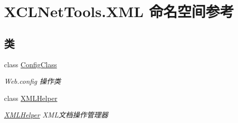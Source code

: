 \hypertarget{namespace_x_c_l_net_tools_1_1_x_m_l}{}\section{X\+C\+L\+Net\+Tools.\+X\+ML 命名空间参考}
\label{namespace_x_c_l_net_tools_1_1_x_m_l}
\subsection*{类}
\begin{DoxyCompactItemize}
\item 
class \hyperlink{class_x_c_l_net_tools_1_1_x_m_l_1_1_config_class}{Config\+Class}
\begin{DoxyCompactList}\small\item\em Web.\+config 操作类 \end{DoxyCompactList}\item 
class \hyperlink{class_x_c_l_net_tools_1_1_x_m_l_1_1_x_m_l_helper}{X\+M\+L\+Helper}
\begin{DoxyCompactList}\small\item\em \hyperlink{class_x_c_l_net_tools_1_1_x_m_l_1_1_x_m_l_helper}{X\+M\+L\+Helper} X\+M\+L文档操作管理器 \end{DoxyCompactList}\end{DoxyCompactItemize}
